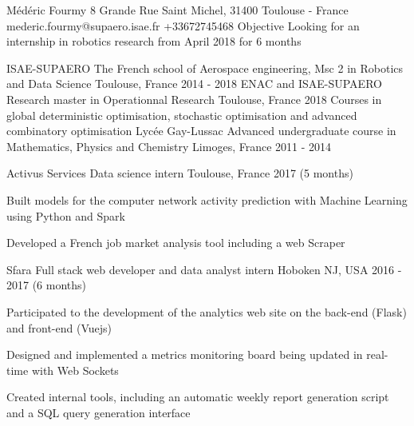 \documentclass[11pt, a4paper, final]{resume}
\begin{document}
	\header
		{Médéric}
		{Fourmy}
		{8 Grande Rue Saint Michel, 31400 Toulouse - France}
		{mederic.fourmy@supaero.isae.fr}
		{+33672745468}
		{Objective}
		{Looking for an internship in robotics research from April 2018 for 6 months}

	\begin{cventries}
		\cventry
		{ISAE-SUPAERO}
		{The French school of Aerospace engineering, Msc 2 in Robotics and Data Science}
		{Toulouse, France}
		{2014 - 2018}
		{}
		\cventry
		{ENAC and ISAE-SUPAERO}
		{Research master in Operationnal Research}
		{Toulouse, France}
		{2018}
		{Courses in global deterministic optimisation, stochastic optimisation and advanced combinatory optimisation}
		\cventry
		{Lycée Gay-Lussac}
		{Advanced undergraduate course in Mathematics, Physics and Chemistry}
		{Limoges, France}
		{2011 - 2014}
		{}
	\end{cventries}

	\cvsection{Work experience}
	\begin{cventries}
		\cventry
		{Activus Services}
		{Data science intern}
		{Toulouse, France}
		{2017 (5 months)}
		{
			\begin{cvitems}{}
				\item Built models for the computer network activity prediction with Machine Learning using Python and Spark
				\item Developed a French job market analysis tool including a web Scraper
			\end{cvitems}
		}
		\cventry
		{Sfara}
		{Full stack web developer and data analyst intern}
		{Hoboken NJ, USA}
		{2016 - 2017 (6 months)}
		{
			\begin{cvitems}{}
				\item Participated to the development of the analytics web site on the back-end (Flask) and front-end (Vuejs)
				\item Designed and implemented a metrics monitoring board being updated in real-time with Web Sockets
				\item Created internal tools, including an automatic weekly report generation script and a SQL query generation interface
			\end{cvitems}
		}
	\end{cventries}
\end{document}
